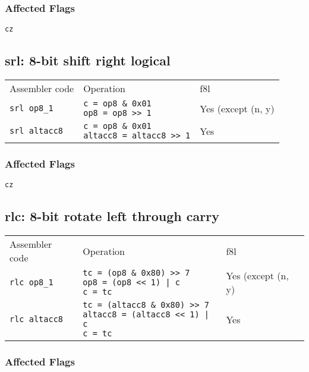 \documentclass{book}
\begin{document}
\subsubsection*{Affected Flags}

\texttt{cz}


\subsection{srl: 8-bit shift right logical}

\begin{tabular}{l l l}
Assembler code       & Operation                                                            & f8l \\
\texttt{srl op8\_1}  & \makecell{\texttt{c = op8 \& 0x01}\\\texttt{op8 = op8 >> 1}}         & Yes (except (n, y) \\
\texttt{srl altacc8} & \makecell{\texttt{c = op8 \& 0x01}\\\texttt{altacc8 = altacc8 >> 1}} & Yes
\end{tabular}

\subsubsection*{Affected Flags}

\texttt{cz}


\subsection{rlc: 8-bit rotate left through carry}

\begin{tabular}{l l l}
Assembler code       & Operation                                                                                               & f8l \\
\texttt{rlc op8\_1}  & \makecell{\texttt{tc = (op8  \& 0x80) >> 7}\\\texttt{op8 = (op8 << 1) | c}\\\texttt{c = tc}}            & Yes (except (n, y) \\
\texttt{rlc altacc8} & \makecell{\texttt{tc = (altacc8 \& 0x80) >> 7}\\\texttt{altacc8 = (altacc8 << 1) | c}\\\texttt{c = tc}} & Yes
\end{tabular}

\subsubsection*{Affected Flags}
\end{document}
